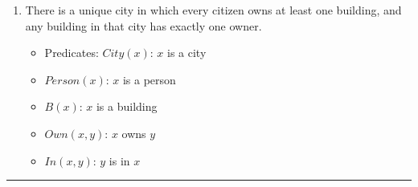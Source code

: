 \documentclass[a4paper,10pt]{article}
\begin{document}
\begin{latin}
\begin{enumerate}
	\item There is a unique city in which every citizen owns at least one building, and any building in that city has exactly one owner.
	\begin{itemize}
		\item[] Predicates: $City(x)$: $x$ is a city
		\item[] $Person(x)$: $x$ is a person
		\item[] $B(x)$: $x$ is a building
		\item[] $Own(x,y)$: $x$ owns $y$
		\item[] $In(x,y)$: $y$ is in $x$
	\end{itemize}
\end{enumerate}
\end{latin}
\textcolor{AccentCyan}{\rule{\linewidth}{0.4pt}}
\end{document}
